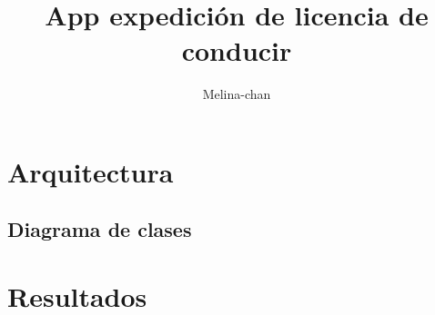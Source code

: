 \documentclass[12pt, letterpaper]{article}
\title{App expedición de licencia de conducir}
\author{Melina-chan}
\begin{document}
	
	
	\tableofcontents	
	
	
	
		
		
	\section{Arquitectura}
		\subsection{Diagrama de clases}
		
	\section{Resultados}
\end{document}
